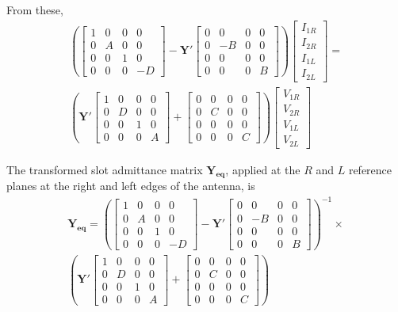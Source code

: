 \documentclass{article}
\begin{document}
From these, 
\begin{multline}
\left(\begin{bmatrix}1 & 0&0&0\\0&A&0&0\\0&0&1&0\\0&0&0&-D\end{bmatrix} -\mathbf{Y'}\begin{bmatrix}0 & 0&0&0\\0&-B&0&0\\0&0&0&0\\0&0&0&B\end{bmatrix}\right)\begin{bmatrix}I_{1R}\\ I_{2R}\\I_{1L}\\I_{2L}\end{bmatrix} =\\
\left(\mathbf{Y'}\begin{bmatrix}1 & 0&0&0\\0&D&0&0\\0&0&1&0\\0&0&0&A\end{bmatrix} +\begin{bmatrix}0 & 0&0&0\\0&C&0&0\\0&0&0&0\\0&0&0&C\end{bmatrix}\right)\begin{bmatrix}V_{1R}\\ V_{2R}\\V_{1L}\\V_{2L}\end{bmatrix}
\end{multline}

The transformed slot admittance matrix $\mathbf{Y_{eq}}$, applied at the $R$ and $L$ reference planes at the right and left edges of the antenna, is
\begin{multline}
\mathbf{Y_{eq}}=\left(\begin{bmatrix}1 & 0&0&0\\0&A&0&0\\0&0&1&0\\0&0&0&-D\end{bmatrix} -\mathbf{Y'}\begin{bmatrix}0 & 0&0&0\\0&-B&0&0\\0&0&0&0\\0&0&0&B\end{bmatrix}\right)^{-1}\times\\ \left(\mathbf{Y'}\begin{bmatrix}1 & 0&0&0\\0&D&0&0\\0&0&1&0\\0&0&0&A\end{bmatrix} +\begin{bmatrix}0 & 0&0&0\\0&C&0&0\\0&0&0&0\\0&0&0&C\end{bmatrix}\right)
\end{multline}
\end{document}
